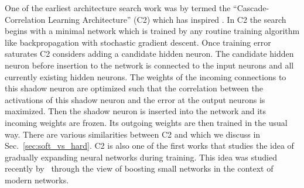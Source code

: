One of the earliest architecture search work was by \cite{cascadecorr} termed the ``Cascade-Correlation Learning Architecture'' (C2) which has inspired \Petridish. In C2 the search begins with a minimal network which is trained by any routine training algorithm like backpropagation with stochastic gradient descent. Once training error saturates C2 considers adding a candidate hidden neuron. The candidate hidden neuron before insertion to the network is connected to the input neurons and all currently existing hidden neurons. The weights of the incoming connections to this shadow neuron are optimized such that the correlation between the activations of this shadow neuron and the error at the output neurons is maximized. Then the shadow neuron is inserted into the network and its incoming weights are frozen. Its outgoing weights are then trained in the usual way. There are various similarities between C2 and \Petridish which we discuss in Sec.~\ref{sec:soft_vs_hard}.
C2 is also one of the first works that studies the idea of gradually expanding neural networks during training. This idea was studied recently by~\citep{adanet, boostedresnet} through the view of boosting small networks in the context of modern networks. 

